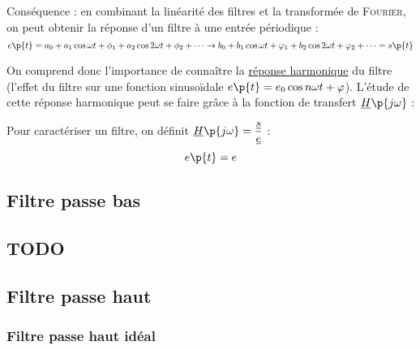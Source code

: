     Conséquence : en combinant la linéarité des filtres et la transformée de \textsc{Fourier}, on peut obtenir la réponse d'un filtre à une entrée périodique :
    \[ e\p{t} = a_0 + a_1\cos{\omega t + \phi_1} + a_2\cos{2\omega t + \phi_2} + \dots \rightarrow b_0 + b_1\cos{\omega t + \varphi_1} + b_2\cos{2\omega t + \varphi_2} + \dots = s\p{t}\]
    
    On comprend donc l'importance de connaître la \underline{réponse harmonique} du filtre (l'effet du filtre sur une fonction sinusoïdale $e\p{t} = e_0\cos{n\omega t + \varphi}$). L'étude de cette réponse harmonique peut se faire grâce à la fonction de transfert $\underline{H}\p{j\omega}$ :

    Pour caractériser un filtre, on définit  $\underline{H}\p{j\omega} = \dfrac{\underline s}{\underline e}$ :
    \[ e\p{t} = e \]
    
    \subsection{Filtre passe bas}
    
    \subsection{TODO}
    
    \newpage
    
    \subsection{Filtre passe haut}
    
    \subsubsection{Filtre passe haut idéal}
    
